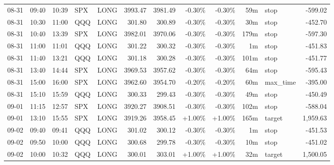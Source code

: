 \documentclass[11pt,a4paper,twoside]{article}
\begin{document}
\begin{center}
\begin{longtable}{>{\color{txtmain}}l l l l l r r r r r >{\color{txtmain}}l r}
08-31 & 09:40 & 10:39 & SPX & LONG & 3993.47 & 3981.49 & \textcolor{lossred}{-0.30\%} & \textcolor{lossred}{-0.30\%} & 59m & stop & \textcolor{lossred}{-599.02} \\
08-31 & 10:30 & 11:00 & QQQ & LONG & 301.80 & 300.89 & \textcolor{lossred}{-0.30\%} & \textcolor{lossred}{-0.30\%} & 30m & stop & \textcolor{lossred}{-452.70} \\
08-31 & 10:40 & 13:39 & SPX & LONG & 3982.01 & 3970.06 & \textcolor{lossred}{-0.30\%} & \textcolor{lossred}{-0.30\%} & 179m & stop & \textcolor{lossred}{-597.30} \\
08-31 & 11:00 & 11:01 & QQQ & LONG & 301.22 & 300.32 & \textcolor{lossred}{-0.30\%} & \textcolor{lossred}{-0.30\%} & 1m & stop & \textcolor{lossred}{-451.83} \\
08-31 & 11:40 & 13:21 & QQQ & LONG & 301.18 & 300.28 & \textcolor{lossred}{-0.30\%} & \textcolor{lossred}{-0.30\%} & 101m & stop & \textcolor{lossred}{-451.77} \\
08-31 & 13:40 & 14:44 & SPX & LONG & 3969.53 & 3957.62 & \textcolor{lossred}{-0.30\%} & \textcolor{lossred}{-0.30\%} & 64m & stop & \textcolor{lossred}{-595.43} \\
08-31 & 15:00 & 16:00 & SPX & LONG & 3962.60 & 3954.70 & \textcolor{lossred}{-0.20\%} & \textcolor{lossred}{-0.20\%} & 60m & max\_time & \textcolor{lossred}{-395.00} \\
08-31 & 15:10 & 15:59 & QQQ & LONG & 300.33 & 299.43 & \textcolor{lossred}{-0.30\%} & \textcolor{lossred}{-0.30\%} & 49m & stop & \textcolor{lossred}{-450.49} \\
09-01 & 11:15 & 12:57 & SPX & LONG & 3920.27 & 3908.51 & \textcolor{lossred}{-0.30\%} & \textcolor{lossred}{-0.30\%} & 102m & stop & \textcolor{lossred}{-588.04} \\
09-01 & 13:10 & 15:55 & SPX & LONG & 3919.26 & 3958.45 & \textcolor{wingreen}{+1.00\%} & \textcolor{wingreen}{+1.00\%} & 165m & target & \textcolor{wingreen}{1,959.63} \\
09-02 & 09:40 & 09:41 & QQQ & LONG & 301.02 & 300.12 & \textcolor{lossred}{-0.30\%} & \textcolor{lossred}{-0.30\%} & 1m & stop & \textcolor{lossred}{-451.53} \\
09-02 & 09:50 & 10:00 & QQQ & LONG & 300.68 & 299.78 & \textcolor{lossred}{-0.30\%} & \textcolor{lossred}{-0.30\%} & 10m & stop & \textcolor{lossred}{-451.02} \\
09-02 & 10:00 & 10:32 & QQQ & LONG & 300.01 & 303.01 & \textcolor{wingreen}{+1.00\%} & \textcolor{wingreen}{+1.00\%} & 32m & target & \textcolor{wingreen}{1,500.05} \\

\end{longtable}
\end{center}
\end{document}
